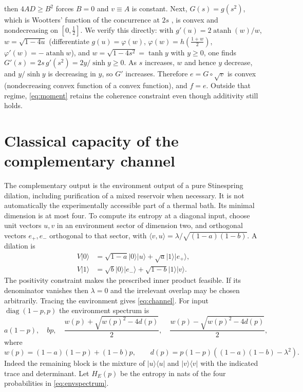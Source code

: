 \documentclass[11pt]{article}
\begin{document}
then $4AD\ge B^2$ forces $B=0$ and $v\equiv A$ is constant. Next, $G(s)=g(s^2)$, which is Wootters' function of the concurrence at $2s$ \cite{wootters}, is
convex and nondecreasing on $[0,\tfrac12]$. We verify this directly: with $g'(u)=2\operatorname{atanh}(w)/w$,
$w=\sqrt{1-4u}$ (differentiate $g(u)=\varphi(w)$, $\varphi(w)=h(\tfrac{1+w}2)$, $\varphi'(w)=-\operatorname{atanh}w$),
and $w=\sqrt{1-4s^2}=\tanh y$ with $y\ge0$, one finds $G'(s)=2s\,g'(s^2)=2y/\sinh y\ge0$.
As $s$ increases, $w$ and hence $y$ decrease, and $y/\sinh y$ is decreasing in $y$, so $G'$ increases.
Therefore $e=G\circ\sqrt v$ is convex (nondecreasing convex function of a convex function), and $f=e$. Outside that regime, \eqref{eq:moment}
retains the coherence constraint even though additivity still holds.

\section{Classical capacity of the complementary channel}\label{sec:complement}
The complementary output is the environment output of a pure Stinespring
dilation, including purification of a mixed reservoir when necessary. It is
not automatically the experimentally accessible part of a thermal bath.
Its minimal dimension is at most four. To compute its entropy at a diagonal
input, choose unit vectors $u,v$ in an environment sector of dimension two,
and orthogonal vectors $e_+,e_-$ orthogonal to that sector, with
$\langle v,u\rangle=\lambda/\sqrt{(1-a)(1-b)}$. A dilation is
\begin{align*}
 V|0\rangle&=\sqrt{1-a}|0\rangle|u\rangle+
                         \sqrt a|1\rangle|e_+\rangle,\\
 V|1\rangle&=\sqrt b|0\rangle|e_-\rangle+
                         \sqrt{1-b}|1\rangle|v\rangle.
\end{align*}
The positivity constraint makes the prescribed inner product feasible.
If its denominator vanishes then $\lambda=0$ and the irrelevant overlap may
be chosen arbitrarily. Tracing the environment gives \eqref{eq:channel}.
For input $\operatorname{diag}(1-p,p)$ the environment spectrum is
\begin{equation}\label{eq:envspectrum}
 a(1-p),\quad bp,\quad
 \frac{w(p)+\sqrt{w(p)^2-4d(p)}}2,\quad
 \frac{w(p)-\sqrt{w(p)^2-4d(p)}}2,
\end{equation}
where
\[
 w(p)=(1-a)(1-p)+(1-b)p,\qquad
 d(p)=p(1-p)((1-a)(1-b)-\lambda^2).
\]
Indeed the remaining block is the mixture of $|u\rangle\langle u|$ and
$|v\rangle\langle v|$ with the indicated trace and determinant. Let $H_E(p)$
be the entropy in nats of the four probabilities in \eqref{eq:envspectrum}.
\end{document}

